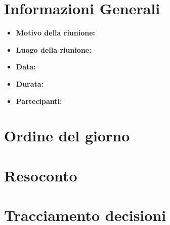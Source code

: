 \section{Informazioni Generali}
\begin{itemize}
	\item \textbf{Motivo della riunione:}
	\item \textbf{Luogo della riunione:}
	\item \textbf{Data:}
	\item \textbf{Durata:}
	\item \textbf{Partecipanti:}
	
\end{itemize}

\section{Ordine del giorno}

\section{Resoconto}

\section{Tracciamento decisioni}

